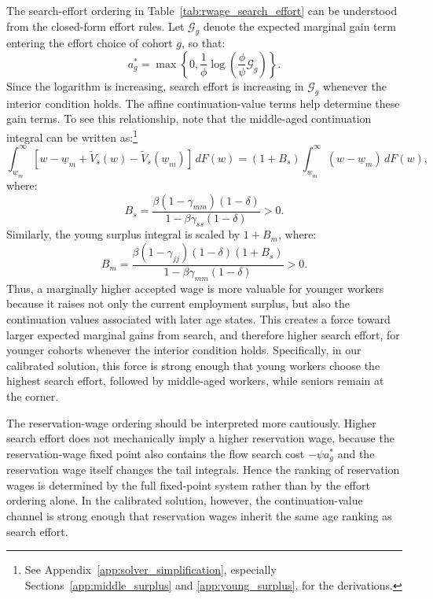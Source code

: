 \documentclass{article}
\begin{document}
The search-effort ordering in Table~\ref{tab:rwage_search_effort} can be understood from the closed-form effort rules. Let $\mathcal G_g$ denote the expected marginal gain term entering the effort choice of cohort $g$, so that:
\[
a_g^*
=
\max\left\{
0,\frac{1}{\phi}
\log\left(\frac{\phi}{\psi}\mathcal G_g\right)
\right\}.
\]
Since the logarithm is increasing, search effort is increasing in $\mathcal G_g$ whenever the interior condition holds. The affine continuation-value terms help determine these gain terms. To see this relationship, note that the middle-aged continuation integral can be written as:\footnote{See Appendix~\ref{app:solver_simplification}, especially Sections~\ref{app:middle_surplus} and \ref{app:young_surplus}, for the derivations.}
\[
\int_{\underline w_m}^{\infty}
\left[
w-\underline w_m+\tilde V_s(w)-\tilde V_s(\underline w_m)
\right]\,dF(w)
=
(1+B_s)
\int_{\underline w_m}^{\infty}
(w-\underline w_m)\,dF(w),
\]
where:
\[
B_s
=
\frac{\beta(1-\gamma_{mm})(1-\delta)}
{1-\beta\gamma_{ss}(1-\delta)}
>0.
\]
Similarly, the young surplus integral is scaled by $1+B_m$, where:
\[
B_m
=
\frac{\beta(1-\gamma_{jj})(1-\delta)(1+B_s)}
{1-\beta\gamma_{mm}(1-\delta)}
>0.
\]
Thus, a marginally higher accepted wage is more valuable for younger workers because it raises not only the current employment surplus, but also the continuation values associated with later age states. This creates a force toward larger expected marginal gains from search, and therefore higher search effort, for younger cohorts whenever the interior condition holds. Specifically, in our calibrated solution, this force is strong enough that young workers choose the highest search effort, followed by middle-aged workers, while seniors remain at the corner.

The reservation-wage ordering should be interpreted more cautiously. Higher search effort does not mechanically imply a higher reservation wage, because the reservation-wage fixed point also contains the flow search cost $-\psi a_g^*$ and the reservation wage itself changes the tail integrals. Hence the ranking of reservation wages is determined by the full fixed-point system rather than by the effort ordering alone. In the calibrated solution, however, the continuation-value channel is strong enough that reservation wages inherit the same age ranking as search effort.
\end{document}
